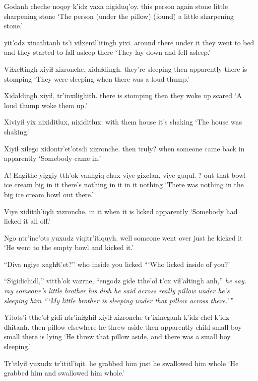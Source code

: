 \documentclass[12pt]{article}
\begin{document}
\gll Godanh cheche noqoy k'idz {vaxa nigiduq'oy.}
{this person} again stone little {sharpening stone}
\glt `The person (under the pillow) (found) a little sharpening stone.'
\glend

 yit'odz xinathtanh ts'i viɬxentl'itingh yixi.
{around there} {under it} {they went to bed} and {they started to fall asleep} there
\glt `They lay down and fell asleep.'
\glend

\gll Viɬxeɬtingh xiyiɬ xizronche, xidaɬdingh. 
{they're sleeping} then apparently {there is stomping}
\glt `They were sleeping when there was a loud thump.'
\glend

\gll Xidaɬdingh xiyiɬ, tr'inxilighith.
{there is stomping} then {they woke up scared}
\glt `A loud thump woke them up.'
\glend

\gll Xiviyiɬ yix nixiditlux, nixiditlux.
{with them} house {it's shaking}
\glt `The house was shaking.'
\glend

\gll Xiyiɬ xilego xidontr'et'otsdi xizronche.
then truly? {when someone came back in} apparently
\glt `Somebody came in.'
\glend

\gll A! Engithe yiggiy tth'ok vanhgiq chux viye gixelan, viye guqul.
? out that bowl {ice cream} big {in it} {there's nothing in it} {in it} nothing
\glt `There was nothing in the big ice cream bowl out there.'
\glend

\gll Viye xiditth'iqdi xizronche.
{in it} {when it is licked} apparently
\glt `Somebody had licked it all off.'
\glend

\gll Ngo ntr'ine'ots yuxudz viqitr'itlquyh.
well {someone went over} just {he kicked it}
\glt `He went to the empty bowl and kicked it.'
\glend

\gll ``Diva ngiye xaghɬt'et?''
who {inside you} {licked}
\glt ```Who licked inside of you?'
\glend

\gll ``Sigidichidl,'' vitth'ok vazrne, ``engodz gide tthe'oɬ t'ox viɬ'aɬtingh anh,'' \em {he say.}
{my someone's little brother} {his dish} {he said} {across} really pillow under {he's sleeping} him 
\glt ```My little brother is sleeping under that pillow across there.'''
\glend

\gll Yitots'i tthe'oɬ gidi ntr'iniɬghiɬ xiyiɬ xizronche tr'ixineganh k'idz chel k'idz dhitanh.
then pillow {elsewhere} {he threw aside} then apparently child small boy small {there is lying}
\glt `He threw that pillow aside, and there was a small boy sleeping.'
\glend

\gll Tr'itlyiɬ yuxudx tr'ititl'iqit.
{he grabbed him} just {he swallowed him whole}
\glt `He grabbed him and swallowed him whole.'
\glend
\end{document}
